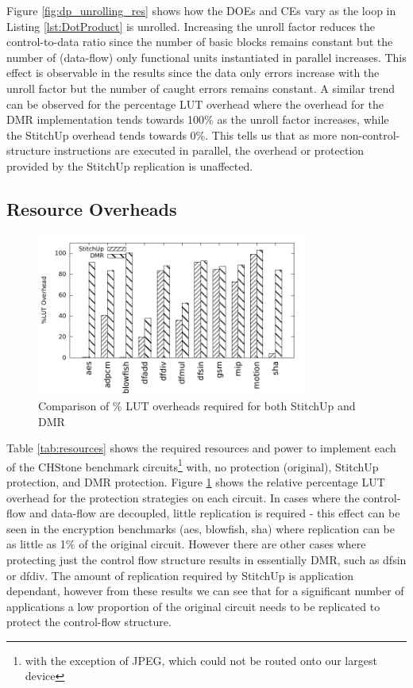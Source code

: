 Figure \ref{fig:dp_unrolling_res} shows how the DOEs and CEs vary as the loop in Listing \ref{lst:DotProduct}
is unrolled.
Increasing the unroll factor reduces the control-to-data ratio since the number of basic blocks remains constant but the number of (data-flow)
only functional units instantiated in parallel increases.
This effect is observable in the results since the data only errors increase with the unroll factor but the number of caught errors
remains constant.
A similar trend can be observed for the percentage LUT overhead where the overhead for the DMR implementation
tends towards 100\% as the unroll factor increases, while the StitchUp overhead tends towards 0\%.
This tells us that as more non-control-structure instructions are executed in parallel, the overhead or
protection provided by the StitchUp replication is unaffected.

\subsection{Resource Overheads}
\renewcommand{\arraystretch}{0.8}

\begin{figure}[h]
\centering
\includegraphics[width=3.5in]{./graphs/luts_res.pdf}
\caption{Comparison of \% LUT overheads required for both StitchUp and DMR}
\label{fig:lut_res}
\end{figure}

Table \ref{tab:resources} shows the required resources and power to implement
each of the CHStone benchmark circuits\footnote{with the exception of JPEG, which could not be routed onto our largest device}
with, no protection (original), StitchUp protection, and DMR protection.
Figure \ref{fig:lut_res} shows the relative percentage LUT overhead for the protection strategies on each circuit.
In cases where the control-flow and data-flow are decoupled, little replication is required - this effect can be seen in
the encryption benchmarks (aes, blowfish, sha) where replication can be as little as 1\% of the original circuit.
However there are other cases where protecting just the control flow structure results in essentially DMR, such as dfsin or dfdiv.
The amount of replication required by StitchUp is application dependant, however from these results we can see
that for a significant number of applications a low proportion of the original circuit needs to be replicated to
protect the control-flow structure.


